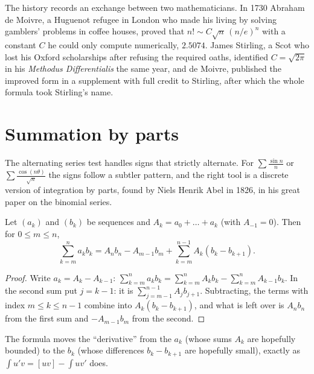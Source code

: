 The history records an exchange between two mathematicians. In 1730 Abraham de Moivre, a Huguenot refugee in London who made his living by solving gamblers'
problems in coffee houses, proved that $n!\sim C\sqrt n\,(n/e)^n$ with a constant $C$ he could only compute numerically, $2.5074$. James Stirling, a
Scot who lost his Oxford scholarships after refusing the required oaths, identified $C=\sqrt{2\pi}$ in his \emph{Methodus Differentialis} the same year, and de Moivre,
published the improved form in a supplement with full credit to Stirling, after which the whole formula took Stirling's name.

\section{Summation by parts}

The alternating series test handles signs that strictly alternate. For $\sum\frac{\sin n}n$ or $\sum\frac{\cos(n\theta)}{\sqrt n}$ the signs follow a
subtler pattern, and the right tool is a discrete version of integration by parts, found by Niels Henrik Abel in 1826, in his great paper on the binomial series.

\begin{proposition}\label{prop:abelsum}
Let $(a_k)$ and $(b_k)$ be sequences and $A_k=a_0+\dots+a_k$ (with $A_{-1}=0$). Then for $0\le m\le n$,
\[
\sum_{k=m}^na_kb_k=A_nb_n-A_{m-1}b_m+\sum_{k=m}^{n-1}A_k(b_k-b_{k+1}).
\]
\end{proposition}
\begin{proof}
Write $a_k=A_k-A_{k-1}$: $\sum_{k=m}^na_kb_k=\sum_{k=m}^nA_kb_k-\sum_{k=m}^nA_{k-1}b_k$. In the second sum put $j=k-1$: it is $\sum_{j=m-1}^{n-1}A_jb_{j+1}$.
Subtracting, the terms with index $m\le k\le n-1$ combine into $A_k(b_k-b_{k+1})$, and what is left over is $A_nb_n$ from the first sum and $-A_{m-1}b_m$ from the second.
\end{proof}

The formula moves the ``derivative'' from the $a_k$ (whose sums $A_k$ are hopefully bounded) to the $b_k$ (whose differences $b_k-b_{k+1}$ are hopefully small), exactly as
$\int u'v=[uv]-\int uv'$ does.

